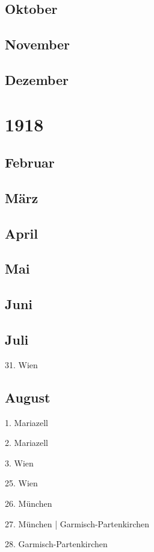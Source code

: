 \documentclass[twoside=false,titlepage=false,open=any, parskip=never, fontsize=10pt, headings=small, chapterprefix=false, appendixprefix=false, DIV=15]{scrbook}
\begin{document}
\begin{multicols}{3}
            \section*{Oktober}
            \section*{November}
            \section*{Dezember}
            \chapter*{1918}
            \section*{Februar}
            \section*{März}
            \section*{April}
            \section*{Mai}
            \section*{Juni}
            \section*{Juli}
            31. Wien\par
            \section*{August}
            1. Mariazell\par
            2. Mariazell\par
            3. Wien\par
            25. Wien\par
            26. München\par
            27. München | Garmisch-Partenkirchen\par
            28. Garmisch-Partenkirchen\par

\end{multicols}
\end{document}
